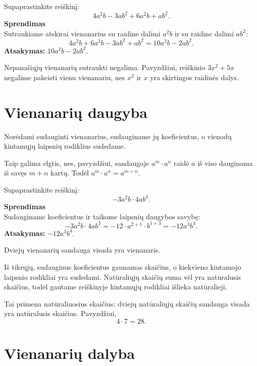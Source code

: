 \documentclass[11pt,a4paper]{scrartcl}
\begin{document}
\begin{example}
Supaprastinkite reiškinį:
\[
4a^2b-3ab^2+6a^2b+ab^2.
\]
\textbf{Sprendimas}\\
Sutraukiame atskirai vienanarius su raidine dalimi $a^2b$ ir su raidine dalimi $ab^2$:
\[
4a^2b+6a^2b-3ab^2+ab^2=10a^2b-2ab^2.
\]
\textbf{Atsakymas:} $10a^2b-2ab^2$.
\end{example}

\begin{remark}
Nepanašiųjų vienanarių sutraukti negalima. Pavyzdžiui, reiškinio $3x^2+5x$ negalime pakeisti vienu vienanariu, nes $x^2$ ir $x$ yra skirtingos raidinės dalys.
\end{remark}

\section{Vienanarių daugyba}

\begin{monomialrule}
Norėdami sudauginti vienanarius, sudauginame jų koeficientus, o vienodų kintamųjų laipsnių rodiklius sudedame.

Taip galima elgtis, nes, pavyzdžiui, sandaugoje $a^m\cdot a^n$ raidė $a$ iš viso dauginama iš savęs $m+n$ kartų. Todėl $a^m\cdot a^n=a^{m+n}$.
\end{monomialrule}

\begin{example}
Supaprastinkite reiškinį:
\[
-3a^2b\cdot 4ab^3.
\]
\textbf{Sprendimas}\\
Sudauginame koeficientus ir taikome laipsnių daugybos savybę:
\[
-3a^2b\cdot 4ab^3=-12\cdot a^{2+1}\cdot b^{1+3}=-12a^3b^4.
\]
\textbf{Atsakymas:} $-12a^3b^4$.
\end{example}

\begin{monomialrule}
Dviejų vienanarių sandauga visada yra vienanaris.
\end{monomialrule}

Iš tikrųjų, sudauginus koeficientus gaunamas skaičius, o kiekvieno kintamojo laipsnio rodikliai yra sudedami. Natūraliųjų skaičių suma vėl yra natūralusis skaičius, todėl gautame reiškinyje kintamųjų rodikliai išlieka natūralieji.

Tai primena natūraliuosius skaičius: dviejų natūraliųjų skaičių sandauga visada yra natūralusis skaičius. Pavyzdžiui,
\[
4\cdot 7=28.
\]

\section{Vienanarių dalyba}
\end{document}
